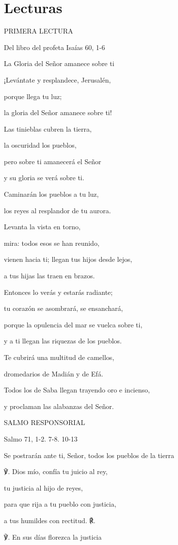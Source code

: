 \section{Lecturas}

PRIMERA LECTURA

Del libro del profeta Isaías 60, 1-6

La Gloria del Señor amanece sobre ti

¡Levántate y resplandece, Jerusalén,

porque llega tu luz;

la gloria del Señor amanece sobre ti!

Las tinieblas cubren la tierra,

la oscuridad los pueblos,

pero sobre ti amanecerá el Señor

y su gloria se verá sobre ti.

Caminarán los pueblos a tu luz,

los reyes al resplandor de tu aurora.

Levanta la vista en torno,

mira: todos esos se han reunido,

vienen hacia ti; llegan tus hijos desde lejos,

a tus hijas las traen en brazos.

Entonces lo verás y estarás radiante;

tu corazón se asombrará, se ensanchará,

porque la opulencia del mar se vuelca sobre ti,

y a ti llegan las riquezas de los pueblos.

Te cubrirá una multitud de camellos,

dromedarios de Madián y de Efá.

Todos los de Saba llegan trayendo oro e incienso,

y proclaman las alabanzas del Señor.

SALMO RESPONSORIAL

Salmo 71, 1-2. 7-8. 10-13

Se postrarán ante ti, Señor, todos los pueblos de la tierra

℣. Dios mío, confía tu juicio al rey,

tu justicia al hijo de reyes,

para que rija a tu pueblo con justicia,

a tus humildes con rectitud. ℟.

℣. En sus días florezca la justicia

